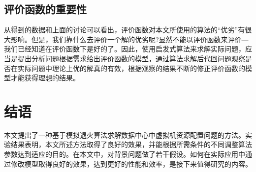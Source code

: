\subsection*{评价函数的重要性}
从得到的数据和上面的讨论可以看出，评价函数对本文所使用的算法的``优劣''有很大影响。但是，我们靠什么去评价一个解的优劣呢?显然不能以评价函数来评价---我们已经知道在评价函数下是好的了。因此，使用启发式算法来求解实际问题，应当是提出分析问题根据需求给出评价函数的模型，通过算法求解后代回问题观察是否在实际问题中理论上优的解真的有效，根据观察的结果不断的修正评价函数的模型才能获得理想的结果。

\section{结语}
本文提出了一种基于模拟退火算法求解数据中心中虚拟机资源配置问题的方法。实验结果表明，本文所述方法取得了良好的效果，并能根据所需条件的不同调整算法参数达到适应的目的。在本文中，对背景问题做了若干假设。如何在实际应用中通过修改模型取得良好的效果，达到更好的性能和效率，是接下来值得研究的内容。




